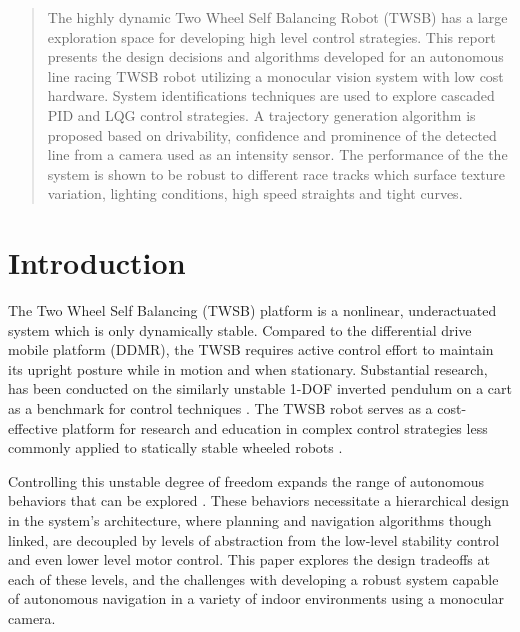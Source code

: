     \uomdeclarations

    \begin{abstract} %
        The highly dynamic Two Wheel Self Balancing Robot 
        (TWSB) has a large exploration space for developing high level 
        control strategies. 
        This report presents the design decisions and algorithms developed for
        an autonomous line racing TWSB robot utilizing a monocular vision system with low cost hardware. 
        System identifications techniques are used to explore
        cascaded PID and LQG control strategies.
        A trajectory generation algorithm is proposed based on drivability, confidence 
        and prominence of the detected line from a camera used as an intensity sensor. 
        The performance of the the system is shown to be robust to different race tracks which
        surface texture variation, lighting conditions, high speed straights and tight curves. 
  \end{abstract}%
  \clearpage

    \section{Introduction}
    The Two Wheel Self Balancing (TWSB) platform is a nonlinear, underactuated system which is only dynamically stable.
    Compared to the differential drive mobile platform (DDMR), the TWSB requires active control effort
    to maintain its upright posture while in motion and when stationary.
    Substantial research, has been conducted on the similarly unstable 1-DOF inverted pendulum on a cart 
    as a benchmark for control techniques \cite{boubaker2013inverted}. 
    The TWSB robot serves as a cost-effective platform for research and education in complex control 
    strategies less commonly applied to statically stable wheeled robots \cite{educationPlatform}.
    
    Controlling this unstable degree of freedom expands the range of autonomous behaviors that 
    can be explored \cite{RoboLimbo} \cite{jeong2008wheeled} \cite{Browning2004TurningSI}. 
    These behaviors necessitate a hierarchical design in the system's architecture,
    where planning and navigation algorithms though linked, are decoupled by levels of abstraction 
    from the low-level stability control and even lower level motor control. This paper explores 
    the design tradeoffs at each of these levels, and the challenges with developing a robust system 
    capable of autonomous navigation in a variety of indoor environments using a monocular camera.
    
